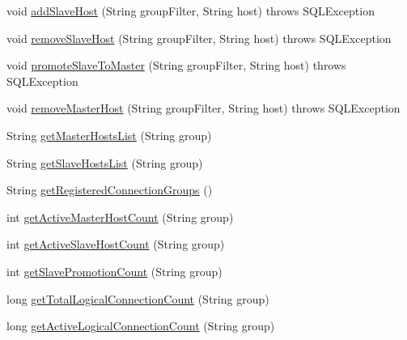\begin{DoxyCompactItemize}
\item 
void \mbox{\hyperlink{interfacecom_1_1mysql_1_1cj_1_1jdbc_1_1jmx_1_1_replication_group_manager_m_bean_af15bd67cccf28ab6a86462cb1f01daad}{add\+Slave\+Host}} (String group\+Filter, String host)  throws S\+Q\+L\+Exception
\item 
void \mbox{\hyperlink{interfacecom_1_1mysql_1_1cj_1_1jdbc_1_1jmx_1_1_replication_group_manager_m_bean_acd360ef771941ca01b7024688d13a1ca}{remove\+Slave\+Host}} (String group\+Filter, String host)  throws S\+Q\+L\+Exception
\item 
void \mbox{\hyperlink{interfacecom_1_1mysql_1_1cj_1_1jdbc_1_1jmx_1_1_replication_group_manager_m_bean_af77170aa95a907b739d969131f6c6fb1}{promote\+Slave\+To\+Master}} (String group\+Filter, String host)  throws S\+Q\+L\+Exception
\item 
void \mbox{\hyperlink{interfacecom_1_1mysql_1_1cj_1_1jdbc_1_1jmx_1_1_replication_group_manager_m_bean_abcbbf35e0fb141f121eef618b51269a2}{remove\+Master\+Host}} (String group\+Filter, String host)  throws S\+Q\+L\+Exception
\item 
String \mbox{\hyperlink{interfacecom_1_1mysql_1_1cj_1_1jdbc_1_1jmx_1_1_replication_group_manager_m_bean_af8d4d300863c1df45e5744b60d57024f}{get\+Master\+Hosts\+List}} (String group)
\item 
String \mbox{\hyperlink{interfacecom_1_1mysql_1_1cj_1_1jdbc_1_1jmx_1_1_replication_group_manager_m_bean_ab7b8410cabf61fad40cdcbd47cf38a73}{get\+Slave\+Hosts\+List}} (String group)
\item 
String \mbox{\hyperlink{interfacecom_1_1mysql_1_1cj_1_1jdbc_1_1jmx_1_1_replication_group_manager_m_bean_a8130f03b15caff9be11bddd2588a6e90}{get\+Registered\+Connection\+Groups}} ()
\item 
int \mbox{\hyperlink{interfacecom_1_1mysql_1_1cj_1_1jdbc_1_1jmx_1_1_replication_group_manager_m_bean_a8fcb4874b474966e00f7491a9047abcf}{get\+Active\+Master\+Host\+Count}} (String group)
\item 
int \mbox{\hyperlink{interfacecom_1_1mysql_1_1cj_1_1jdbc_1_1jmx_1_1_replication_group_manager_m_bean_a79963dacad26e5d118a7972775702d39}{get\+Active\+Slave\+Host\+Count}} (String group)
\item 
int \mbox{\hyperlink{interfacecom_1_1mysql_1_1cj_1_1jdbc_1_1jmx_1_1_replication_group_manager_m_bean_abdb36e1691dfb3ef8281ae8b2d13150f}{get\+Slave\+Promotion\+Count}} (String group)
\item 
long \mbox{\hyperlink{interfacecom_1_1mysql_1_1cj_1_1jdbc_1_1jmx_1_1_replication_group_manager_m_bean_a3ed13df24179ef8319709f279d9b05f0}{get\+Total\+Logical\+Connection\+Count}} (String group)
\item 
long \mbox{\hyperlink{interfacecom_1_1mysql_1_1cj_1_1jdbc_1_1jmx_1_1_replication_group_manager_m_bean_acc828b885c01219278f3ecbd429c5476}{get\+Active\+Logical\+Connection\+Count}} (String group)
\end{DoxyCompactItemize}


